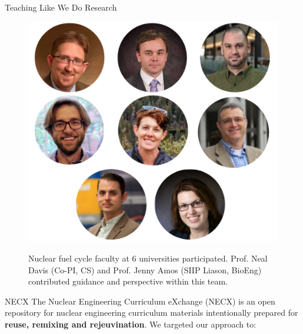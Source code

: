 \documentclass[final]{beamer}
\newlength{\onecolwid}
\newlength{\threecolwid}
\begin{document}
\begin{frame}[t]
\begin{columns}[t,totalwidth=\threecolwid]
\begin{column}{\onecolwid}
\begin{block}{Teaching Like We Do Research}
	\begin{figure}
		\includegraphics[width=\linewidth]{collaboration-img}\\
                \caption{Nuclear fuel cycle faculty at 6 universities 
                participated. Prof. Neal Davis (Co-PI, CS) and 
                Prof. Jenny Amos (SIIP Liason, BioEng) contributed  
                guidance and perspective within this team.}
	\end{figure}

        
\end{block}
\begin{block}{NECX} 
        The Nuclear Engineering Curriculum eXchange (NECX) is an open 
        repository for nuclear engineering curriculum materials intentionally 
        prepared for \textbf{reuse, remixing and rejeuvination}. We targeted 
        our approach to: 
        \vspace{0.25in}
       

\end{block}
\end{column}
\end{columns}
\end{frame}
\end{document}
